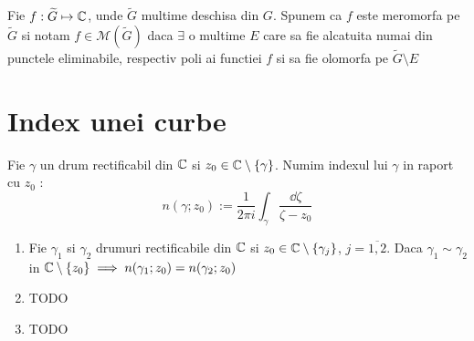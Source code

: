 \begin{definition}
    Fie $f : \widetilde{G} \mapsto \mathbb{C}$, unde $\widetilde{G}$ multime deschisa din $G$.
    Spunem ca $f$ este meromorfa pe $\widetilde{G}$ si notam $f\in \mathcal{M}(\widetilde{G})$ daca
    $\exists$ o multime $E$ care sa fie alcatuita numai din punctele eliminabile, respectiv poli
    ai functiei $f$ si sa fie olomorfa pe $\widetilde{G} \setminus E$
\end{definition}

\section{Index unei curbe}

\begin{definition}
    Fie $\gamma$ un drum rectificabil din $\mathbb{C}$ si $z_0 \in \mathbb{C} \setminus \{ \gamma \}$.
    Numim indexul lui $\gamma$ in raport cu $z_0$ :
    \begin{equation}
        n(\gamma;z_0) := \frac{1}{2 \pi i} \int_{\gamma} \frac{\dd \zeta}{\zeta - z_0}
    \end{equation}
\end{definition}

\begin{theorem}
    \begin{enumerate}
        \item Fie $\gamma_1$ si $\gamma_2$ drumuri rectificabile din $\mathbb{C}$
            si $z_0 \in \mathbb{C} \setminus \{\gamma_j\}$, $j=\overline{1,2}$. Daca $\gamma_1 \sim \gamma_2$
            in $\mathbb{C} \setminus\{z_0\} \implies n(\gamma_1;z_0) = n(\gamma_2;z_0)$
        \item TODO
        \item TODO
    \end{enumerate}
\end{theorem}